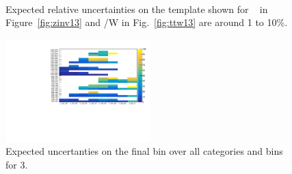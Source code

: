 \begin{figure}[h!]
  \centering
  ~~
  \\
  \caption{\label{fig:expected13} Expected relative uncertainties on the template shown for \zInv~ in Figure~\ref{fig:zinv13} 
  and \ttbar/W in Fig.~\ref{fig:ttw13} are around 1 to 10\%.}
  
\end{figure}
\begin{figure}[]
  \centering
  \includegraphics[width=0.5\textwidth]{figures/template/frenchFlagLastBin.pdf}
  \caption{\label{fig:frenchFlagLastBin} Expected uncertanties on the final bin
over all categories and \scalht bins for 3\ifb.}
\end{figure}

